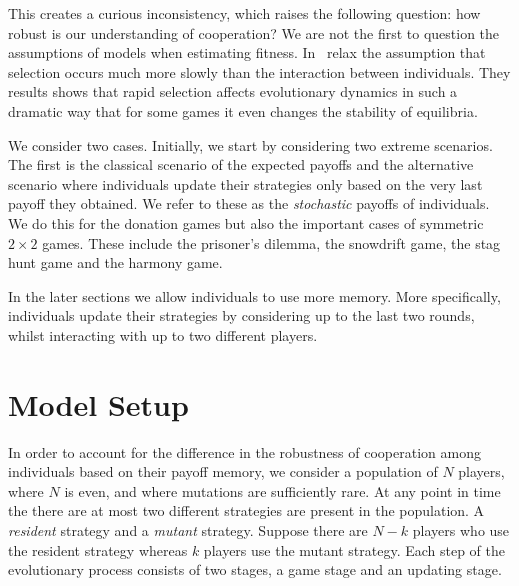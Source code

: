\documentclass[11pt]{article}
\theoremstyle{plainCl1}
\theoremstyle{plainCl2}
\begin{document}
This creates a curious inconsistency, which raises the following question: how
robust is our understanding of cooperation? We are not the first to question the
assumptions of models when estimating fitness. In~\cite{Roca2006} relax the
assumption that selection occurs much more slowly than the interaction between
individuals. They results shows that rapid selection affects evolutionary
dynamics in such a dramatic way that for some games it even changes the
stability of equilibria.

We consider two cases. Initially, we start by considering two extreme scenarios.
The first is the classical scenario of the expected payoffs and the alternative
scenario where individuals update their strategies only based on the very last
payoff they obtained. We refer to these as the \textit{stochastic} payoffs of
individuals. We do this for the donation games but also the important cases of
symmetric \(2 \times 2\) games. These include the prisoner's dilemma, the
snowdrift game, the stag hunt game and the harmony game.

In the later sections we allow individuals to use more memory. More specifically,
individuals update their strategies by considering up to the last two rounds,
whilst interacting with up to two different players.


\section{Model Setup}\label{section:model}

In order to account for the difference in the robustness of cooperation among
individuals based on their payoff memory, we consider a population of \(N\)
players, where \(N\) is even, and where mutations are sufficiently rare. At any
point in time the there are at most two different strategies are present in the
population. A \textit{resident} strategy and a \textit{mutant} strategy. Suppose
there are \(N - k\) players who use the resident strategy whereas \(k\) players
use the mutant strategy. Each step of the evolutionary process consists of two
stages, a game stage and an updating stage.
\end{document}

